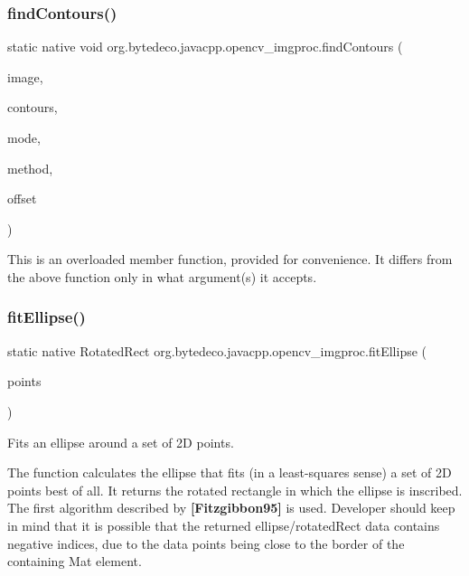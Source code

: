 \subsubsection{\texorpdfstring{find\+Contours()}{findContours()}\hspace{0.1cm}{\footnotesize\ttfamily [2/2]}}
{\footnotesize\ttfamily static native void org.\+bytedeco.\+javacpp.\+opencv\+\_\+imgproc.\+find\+Contours (\begin{DoxyParamCaption}\item[{@By\+Val Mat}]{image,  }\item[{@By\+Val Mat\+Vector}]{contours,  }\item[{int}]{mode,  }\item[{int}]{method,  }\item[{@By\+Val(null\+Value=\char`\"{}cv\+::\+Point()\char`\"{}) Point}]{offset }\end{DoxyParamCaption})\hspace{0.3cm}{\ttfamily [static]}}

This is an overloaded member function, provided for convenience. It differs from the above function only in what argument(s) it accepts. \mbox{\label{group__imgproc__shape_ga4e705f42eefa1224c87285653b6fb44d}} 
\subsubsection{\texorpdfstring{fit\+Ellipse()}{fitEllipse()}}
{\footnotesize\ttfamily static native Rotated\+Rect org.\+bytedeco.\+javacpp.\+opencv\+\_\+imgproc.\+fit\+Ellipse (\begin{DoxyParamCaption}\item[{@By\+Val Mat}]{points }\end{DoxyParamCaption})\hspace{0.3cm}{\ttfamily [static]}}



Fits an ellipse around a set of 2D points. 

The function calculates the ellipse that fits (in a least-\/squares sense) a set of 2D points best of all. It returns the rotated rectangle in which the ellipse is inscribed. The first algorithm described by {\bfseries [Fitzgibbon95]} is used. Developer should keep in mind that it is possible that the returned ellipse/rotated\+Rect data contains negative indices, due to the data points being close to the border of the containing Mat element. 


